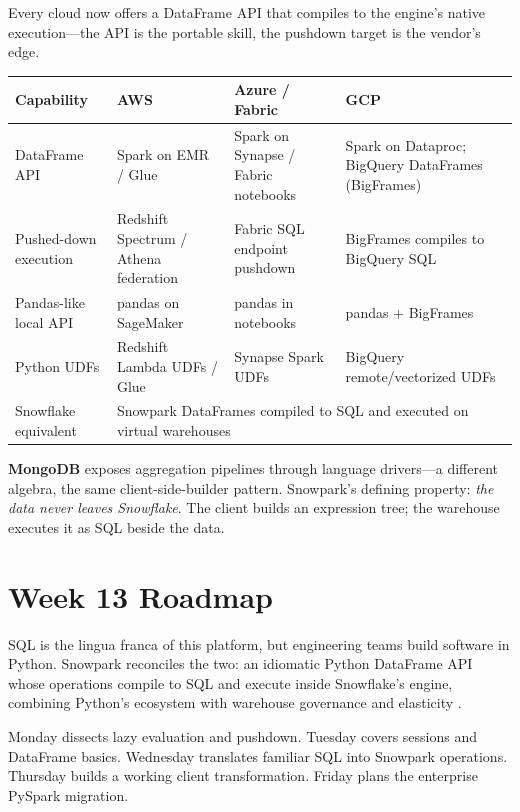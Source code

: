 \begin{crosscloud}
Every cloud now offers a DataFrame API that compiles to the engine's native execution---the API is the portable skill, the pushdown target is the vendor's edge.

\vspace{2mm}
{\footnotesize
\begin{tabular}{@{}p{2.8cm}p{3.0cm}p{3.0cm}p{3.0cm}@{}}
\toprule
\textbf{Capability} & \textbf{AWS} & \textbf{Azure / Fabric} & \textbf{GCP} \\
\midrule
DataFrame API & Spark on EMR / Glue & Spark on Synapse / Fabric notebooks & Spark on Dataproc; BigQuery DataFrames (BigFrames) \\
Pushed-down execution & Redshift Spectrum / Athena federation & Fabric SQL endpoint pushdown & BigFrames compiles to BigQuery SQL \\
Pandas-like local API & pandas on SageMaker & pandas in notebooks & pandas + BigFrames \\
Python UDFs & Redshift Lambda UDFs / Glue & Synapse Spark UDFs & BigQuery remote/vectorized UDFs \\
\addlinespace
Snowflake equivalent & \multicolumn{3}{l}{Snowpark DataFrames compiled to SQL and executed on virtual warehouses} \\
\bottomrule
\end{tabular}}

\vspace{1mm}
\textbf{MongoDB} exposes aggregation pipelines through language drivers---a different algebra, the same client-side-builder pattern. Snowpark's defining property: \emph{the data never leaves Snowflake}. The client builds an expression tree; the warehouse executes it as SQL beside the data.
\end{crosscloud}

\section{Week 13 Roadmap}
SQL is the lingua franca of this platform, but engineering teams build software in Python. Snowpark reconciles the two: an idiomatic Python DataFrame API whose operations compile to SQL and execute inside Snowflake's engine, combining Python's ecosystem with warehouse governance and elasticity \cite{snowflakeSnowparkPythonDocs}.

Monday dissects lazy evaluation and pushdown. Tuesday covers sessions and DataFrame basics. Wednesday translates familiar SQL into Snowpark operations. Thursday builds a working client transformation. Friday plans the enterprise PySpark migration.

